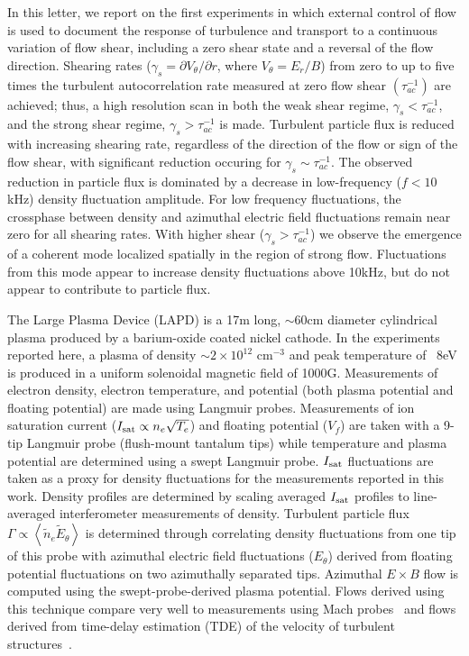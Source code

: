 \documentclass[aps,prl,amsmath,amssymb,preprint,superscriptaddress]{revtex4} %
\begin{document}
In this letter, we report on the first experiments in which external control of flow is used to document the response of turbulence and transport to a continuous variation of flow shear, including a zero shear state and a reversal of the flow direction. Shearing rates ($\gamma_{s}= \partial V_{\theta}/\partial r$, where $V_{\theta} = E_r/B$) from zero to up to five times the turbulent autocorrelation rate measured at zero flow shear $(\tau_{ac}^{-1})$ are achieved; thus, a high resolution scan in both the weak shear regime, $\gamma_{s} < \tau_{ac}^{-1}$, and the strong shear regime, $\gamma_{s} > \tau_{ac}^{-1}$ is made. Turbulent particle flux is reduced with increasing shearing rate, regardless of the direction of the flow or sign of the flow shear, with significant reduction occuring for $\gamma_{s} \sim \tau_{ac}^{-1}$.  The observed reduction in particle flux is dominated by a decrease in low-frequency ($f < 10$kHz) density fluctuation amplitude. For low frequency fluctuations, the crossphase between density and azimuthal electric field fluctuations remain near zero for all shearing rates.  With higher shear ($\gamma_{s} > \tau_{ac}^{-1}$) we observe the emergence of a coherent mode localized spatially in the region of strong flow. Fluctuations from this mode appear to increase density fluctuations above 10kHz, but do not appear to contribute to particle flux.   

The Large Plasma Device \cite{gek91} (LAPD) is a 17m long, $\sim$60cm diameter cylindrical plasma produced by a barium-oxide coated nickel
cathode. In the experiments reported here, a plasma of density $\sim$$2 \times 10^{12}$ cm$^{-3}$ and peak temperature of ~8eV is
produced in a uniform solenoidal magnetic field of 1000G.  Measurements of electron density, electron temperature, and potential (both plasma
potential and floating potential) are made using Langmuir probes.  
Measurements of ion saturation current ($I_{\rm sat} \propto n_e \sqrt{T_e}$) and floating
potential ($V_f$) are taken with a 9-tip Langmuir probe (flush-mount
tantalum tips) while temperature and plasma potential are
determined using a swept Langmuir probe. $I_{\rm sat}$ fluctuations are taken as a proxy for density fluctuations for the measurements reported in this work. Density profiles are determined by scaling averaged $I_{\rm sat}$ profiles to line-averaged interferometer measurements of density.  Turbulent particle flux
$\Gamma \propto \left<\tilde{n}_e \tilde{E}_\theta\right>$ is
determined through correlating density fluctuations from one tip
of this probe with
azimuthal electric field fluctuations ($E_\theta$) derived from
floating potential fluctuations on two azimuthally separated tips.
Azimuthal $E\times B$ flow is computed
using the swept-probe-derived plasma potential.  Flows derived using
this technique compare very well to measurements using
Mach probes~\cite{maggs07} and flows derived from time-delay
estimation (TDE) of the velocity of turbulent structures~\cite{holland04}.
  
\end{document}
